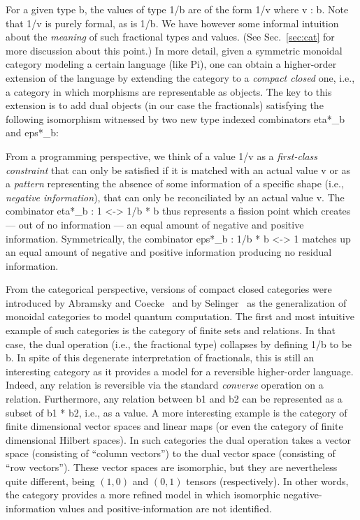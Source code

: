 \documentclass{llncs}
\begin{document}

For a given type {{b}}, the values of type {{1/b}} are of the form {{1/v}}
where {{v : b}}. Note that {{1/v}} is purely formal, as is {{1/b}}. We have
however some informal intuition about the \emph{meaning} of such fractional
types and values. (See Sec.~\ref{sec:cat} for more discussion about this
point.) In more detail, given a symmetric monoidal category modeling a
certain language (like {{Pi}}), one can obtain a higher-order extension of
the language by extending the category to a \emph{compact closed} one, i.e.,
a category in which morphisms are representable as objects. The key to this
extension is to add dual objects (in our case the fractionals) satisfying the
following isomorphism witnessed by two new type indexed combinators 
{{eta*_b}} and {{eps*_b}}:



\noindent From a programming perspective, we think of a value {{1/v}} as a
\emph{first-class constraint} that can only be satisfied if it is matched
with an actual value {{v}} or as a \emph{pattern} representing the absence of
some information of a specific shape (i.e., \emph{negative information}),
that can only be reconciliated by an actual value {{v}}. The combinator
{{eta*_b : 1 <-> 1/b * b}} thus represents a fission point which creates ---
out of no information --- an equal amount of negative and positive
information. Symmetrically, the combinator {{eps*_b : 1/b * b <-> 1}} matches
up an equal amount of negative and positive information producing no residual
information. 

From the categorical perspective, versions of compact closed categories were
introduced by Abramsky and Coecke~\cite{Abramsky:2004:CSQ:1018438.1021878}
and by Selinger~\cite{Selinger:2007:DCC:1229185.1229207} as the
generalization of monoidal categories to model quantum computation.  The
first and most intuitive example of such categories is the category of finite
sets and relations. In that case, the dual operation (i.e., the fractional
type) collapses by defining {{1/b}} to be {{b}}. In spite of this degenerate
interpretation of fractionals, this is still an interesting category as it
provides a model for a reversible higher-order language. Indeed, any relation
is reversible via the standard \emph{converse} operation on a relation.
Furthermore, any relation between {{b1}} and {{b2}} can be
represented as a subset of {{b1 * b2}}, i.e., as a value. A more interesting
example is the category of finite dimensional vector spaces and linear maps
(or even the category of finite dimensional Hilbert spaces). In such
categories the dual operation takes a vector space (consisting of ``column
vectors'') to the dual vector space (consisting of ``row vectors''). These
vector spaces are isomorphic, but they are nevertheless quite different,
being $(1,0)$ and $(0,1)$ tensors (respectively).  In other words, the
category provides a more refined model in which isomorphic
negative-information values and positive-information are not identified.
\end{document}
